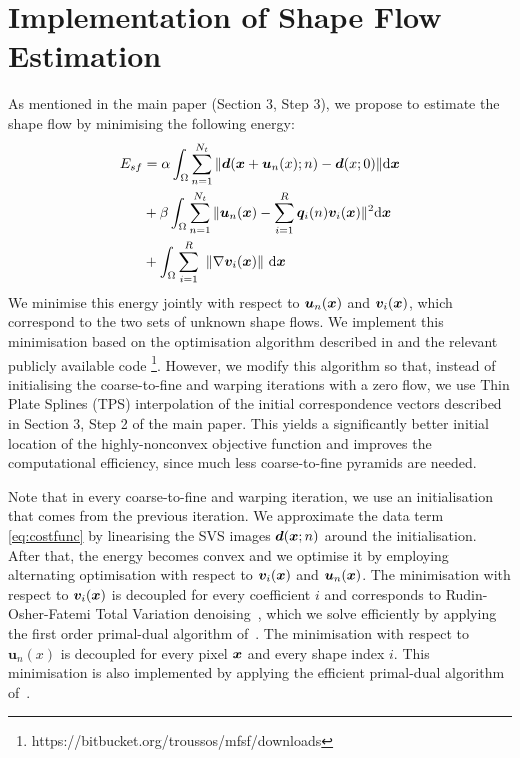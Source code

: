 \section{Implementation of Shape Flow Estimation}
\label{sec:cost_function}


As mentioned in the main paper (Section 3, Step 3), we propose to estimate the shape flow by minimising the following energy:
\vspace{-5pt}
\begin{align}
E_{sf} & =\alpha
\int_{\Omega}\sum_{n=1}^{N_t} \|\bm{d}(\bx+\bm{u}_n(x);n)-\bm{d}(x;0)\| \ud \bx \label{eq:costfunc}\\
    &+ \beta \int_{\Omega}\sum_{n=1}^{N_t}\|\bm{u}_n(\bx)-\sum_{i=1}^R\bm{q}_i(n)\bm{v}_i(\bx)\|^2 \ud \bx \label{eq:lowrank}\\
    &+
\int_\Omega  \sum_{i=1}^R \,\, \left \|    \nabla \bm{v}_i(\bx)    \right \|  \,\ud \bx \label{eq:TVterm}
\vspace{-5pt}
\end{align}
We minimise this energy jointly with respect to $\bm{u}_n(\boldsymbol{x})$ and $\bm{v}_i(\boldsymbol{x})$, which correspond to the
two sets of unknown shape flows.
We implement this minimisation based on the optimisation algorithm described in \cite{Garg:2013hu} and the relevant publicly available code \footnote{https://bitbucket.org/troussos/mfsf/downloads}.
However, we modify this algorithm so that, instead of initialising the coarse-to-fine and warping iterations with a zero flow, we use Thin Plate Splines (TPS) \cite{Bookstein1989} interpolation of the initial correspondence vectors described in Section 3, Step 2 of the main paper.
This yields a significantly better initial location of the highly-nonconvex objective function and improves the computational efficiency, since much less coarse-to-fine pyramids are needed.

Note that in every coarse-to-fine and warping iteration, we use an initialisation that comes from the previous iteration. We approximate the data term \eqref{eq:costfunc} by linearising the SVS images $\bm{d}(\boldsymbol{x};n)$ around the initialisation. After that, the energy becomes convex and we optimise it by employing alternating optimisation with respect to $\bm{v}_i(\boldsymbol{x})$ and $\bm{u}_n(\boldsymbol{x})$. The minimisation with respect to $\bm{v}_i(\boldsymbol{x})$ is decoupled for every coefficient $i$ and corresponds to Rudin-Osher-Fatemi Total Variation denoising~\cite{rudin92}, which we solve efficiently by applying the first order primal-dual algorithm of~\cite{Chambolle:Pock:JMIV2011}. The minimisation with respect to $\bm{u}_n(x)$ is decoupled for every pixel $\boldsymbol{x}$ and every shape index $i$. This minimisation is also implemented by applying the efficient primal-dual algorithm of~\cite{Chambolle:Pock:JMIV2011}.

